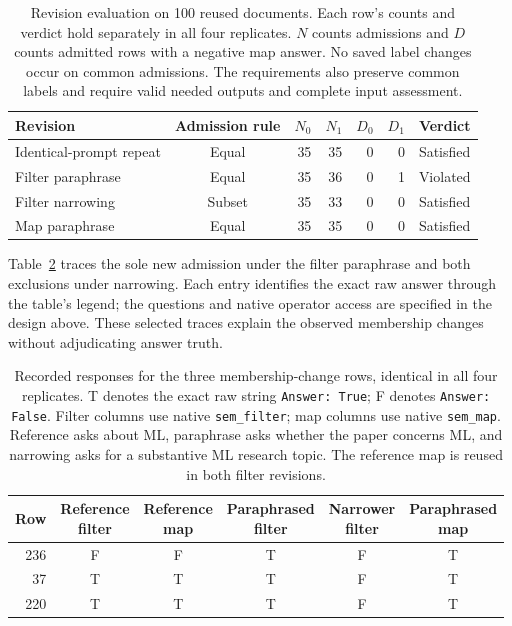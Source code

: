 \documentclass[11pt]{article}
\begin{document}
\begin{table}[t]
\centering
\small
\caption{Revision evaluation on 100 reused documents. Each row's counts and
verdict hold separately in all four replicates. $N$ counts admissions and
$D$ counts admitted rows with a negative map answer. No saved label changes
occur on common admissions. The requirements also preserve common labels
and require valid needed outputs and complete input assessment.}
\label{tab:revision-evaluation}
\begin{tabular}{lcrrrrl}
\toprule
Revision & Admission rule & $N_0$ & $N_1$ & $D_0$ & $D_1$ & Verdict \\
\midrule
Identical-prompt repeat & Equal & 35 & 35 & 0 & 0 & Satisfied \\
Filter paraphrase & Equal & 35 & 36 & 0 & 1 & Violated \\
Filter narrowing & Subset & 35 & 33 & 0 & 0 & Satisfied \\
Map paraphrase & Equal & 35 & 35 & 0 & 0 & Satisfied \\
\bottomrule
\end{tabular}
\end{table}

Table~\ref{tab:revision-trace} traces the sole new admission under the filter
paraphrase and both exclusions under narrowing. Each entry identifies the
exact raw answer through the table's legend; the questions and native
operator access are specified in the design above. These selected traces
explain the observed membership changes without adjudicating answer truth.

\begin{table}[t]
\centering
\small
\caption{Recorded responses for the three membership-change rows, identical
in all four replicates. T denotes the exact raw string \texttt{Answer: True};
F denotes \texttt{Answer: False}. Filter columns use native
\texttt{sem\_filter}; map columns use native \texttt{sem\_map}. Reference
asks about ML, paraphrase asks whether the paper concerns ML, and narrowing
asks for a substantive ML research topic. The reference map is reused in
both filter revisions.}
\label{tab:revision-trace}
\begin{tabular}{rccccc}
\toprule
Row & \shortstack{Reference\\filter} & \shortstack{Reference\\map}
& \shortstack{Paraphrased\\filter} & \shortstack{Narrower\\filter}
& \shortstack{Paraphrased\\map} \\
\midrule
236 & F & F & T & F & T \\
37 & T & T & T & F & T \\
220 & T & T & T & F & T \\
\bottomrule
\end{tabular}
\end{table}
\end{document}
